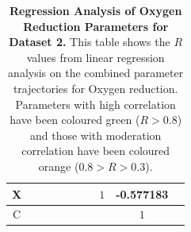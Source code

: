 \begin{table}[p]
{\begin{minipage}{24.4cm}
\begin{tabular}{|c|c|c|c|c|c|c|c|c|c|}
    \hline
    \cellcolor{dark-gray}X & \cellcolor{light-gray} & \cellcolor{light-gray} & \cellcolor{light-gray} & \cellcolor{light-gray} & \cellcolor{light-gray} & \cellcolor{light-gray} & \cellcolor{light-gray}$1$ & \cellcolor{orange}-0.577183 \\
    \hline
    \cellcolor{dark-gray}C & \cellcolor{light-gray} & \cellcolor{light-gray} & \cellcolor{light-gray} & \cellcolor{light-gray} & \cellcolor{light-gray} & \cellcolor{light-gray} & \cellcolor{light-gray} & \cellcolor{light-gray}$1$ \\
    \hline
  \end{tabular}
  \caption[Regression Analysis of Oxygen Reduction Parameters]{{\bf Regression Analysis of Oxygen Reduction Parameters for Dataset 2.} This table shows the $R$ values from linear regression analysis on the combined parameter trajectories for Oxygen reduction. Parameters with high correlation have been coloured green ($R>0.8$) and those with moderation correlation have been coloured orange ($0.8>R>0.3$).
  \label{tab:oxyregress1}}
  \end{minipage}
  }
\end{table}
\afterpage{\clearpage}
